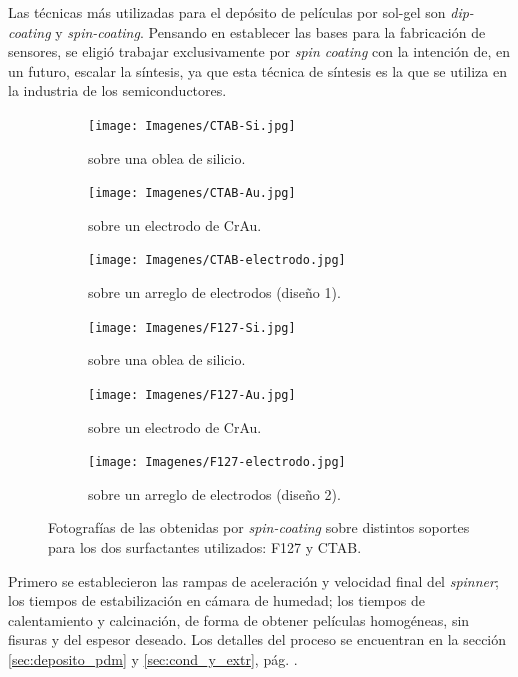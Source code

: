 		Las técnicas más utilizadas para el depósito de películas por sol-gel son \textit{dip-coating} y \textit{spin-coating}. 
		Pensando en establecer las bases para la fabricación de sensores, se eligió trabajar exclusivamente por \textit{spin coating} con la intención de, en un futuro, escalar la síntesis, ya que esta técnica de síntesis es la que se utiliza en la industria de los semiconductores.\cite{Franssila2004,Jaeger2001}  	   	
			\begin{figure}[th]
	 	   	    \begin{subfigure}[t]{0.325\textwidth}
		        	\texttt{[image: Imagenes/CTAB-Si.jpg]}
		       		\caption{\pdmC\space sobre una oblea de silicio.}
		         	\label{fig:F127_vidrio}
		     		\end{subfigure}
	     		\begin{subfigure}[t]{0.325\textwidth}
		        	\texttt{[image: Imagenes/CTAB-Au.jpg]}
		       		\caption{\pdmC\space sobre un electrodo de Cr\textbar Au.}
		         	\label{fig:F127_silicio}
		     		\end{subfigure}
	     		\begin{subfigure}[t]{0.325\textwidth}
		        	\texttt{[image: Imagenes/CTAB-electrodo.jpg]}
		       		\caption{\pdmC\space sobre un arreglo de electrodos (diseño 1).}
		         	\label{fig:F127_Au}
		     		\end{subfigure}
	 	   	    \begin{subfigure}[t]{0.325\textwidth}
		        	\texttt{[image: Imagenes/F127-Si.jpg]}
		       		\caption{\pdmF\space sobre una oblea de silicio.}
		         	\label{fig:CTAB_vidrio}
		     		\end{subfigure}
	     		\begin{subfigure}[t]{0.325\textwidth}
		        	\texttt{[image: Imagenes/F127-Au.jpg]}
		       		\caption{\pdmF\space sobre un electrodo de Cr\textbar Au.}
		         	\label{fig:CTAB_silicio}
		     		\end{subfigure}
	     		\begin{subfigure}[t]{0.325\textwidth}
		        	\texttt{[image: Imagenes/F127-electrodo.jpg]}
		       		\caption{\pdmF\space sobre un arreglo de electrodos (diseño 2).}
		         	\label{fig:CTAB_Au}
		     		\end{subfigure}
	     		\caption[Películas mesoporosas sobre distintos soportes.]{Fotografías de las \pdm\space obtenidas por \textit{spin-coating }sobre distintos soportes para los dos surfactantes utilizados: F127 y CTAB.}
	     		\label{fig:fotos_films}
	     	   	\end{figure}
		Primero se establecieron las rampas de aceleración y velocidad final del \textit{spinner}; los tiempos de estabilización en cámara de humedad; los tiempos de calentamiento y calcinación, de forma de obtener películas homogéneas, sin fisuras y del espesor deseado. Los detalles del proceso se encuentran en la sección \ref{sec:deposito_pdm} y \ref{sec:cond_y_extr}, pág. \pageref{sec:deposito_pdm}. 

